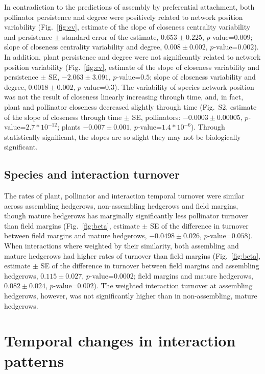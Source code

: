 \documentclass[12pt]{article}
\begin{document}
In contradiction to the predictions of assembly by preferential
attachment, both pollinator persistence and degree were positively
related to network position variability (Fig.~\ref{fig:cv}, estimate
of the slope of closeness centrality variability and persistence $\pm$
standard error of the estimate, $0.653 \pm 0.225$, $p$-value=$0.009$;
slope of closeness centrality variability and degree, $0.008 \pm
0.002$, $p$-value=$0.002$). In addition, plant persistence and degree
were not significantly related to network position variability
(Fig.~\ref{fig:cv}, estimate of the slope of closeness variability and
persistence $\pm$ SE, $-2.063 \pm 3.091$, $p$-value=$0.5$; slope of
closeness variability and degree, $0.0018 \pm 0.002$,
$p$-value=$0.3$). The variability of species network position was not
the result of closeness linearly increasing through time, and, in
fact, plant and pollinator closeness decreased slightly through time
(Fig.~S2, estimate of the slope of closeness through time $\pm$ SE,
pollinators: $-0.0003 \pm 0.00005$, $p$-value=$2.7*10^{-12}$; plants
$-0.007 \pm 0.001$, $p$-value=$1.4*10^{-6}$). Through statistically
significant, the slopes are so slight they may not be biologically
significant.

\subsection*{Species and interaction turnover}
The rates of plant, pollinator and interaction temporal turnover were
similar across assembling hedgerows, non-assembling hedgerows and
field margins, though mature hedgerows has marginally significantly
less pollinator turnover than field margins (Fig.~\ref{fig:beta},
estimate $\pm$ SE of the difference in
turnover between field margins and mature hedgerows, $-0.0498 \pm
0.026$, $p$-value=$0.058$). When interactions where weighted by their
similarity, both assembling and mature hedgerows had higher rates of
turnover than field margins (Fig.~\ref{fig:beta}, estimate $\pm$
SE of the difference in turnover between
field margins and assembling hedgerows, $0.115 \pm 0.027$,
$p$-value=$0.0002$; field margins and mature hedgerows, $0.082 \pm
0.024$, $p$-value=$0.002$). The weighted interaction turnover at
assembling hedgerows, however, was not significantly higher than in
non-assembling, mature hedgerows.

\section*{Temporal changes in interaction patterns}
\end{document}
